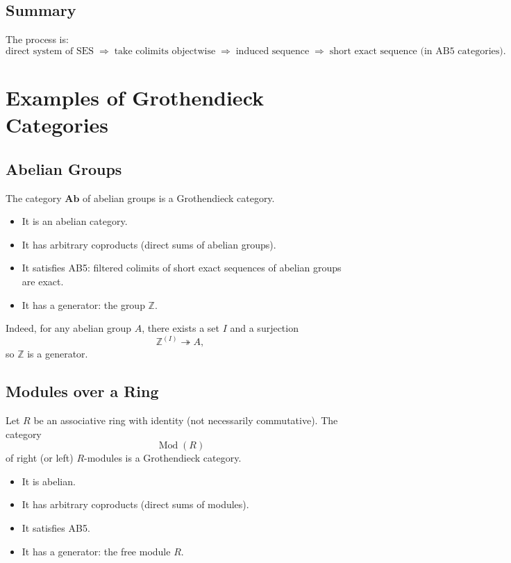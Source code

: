 \subsection*{Summary}

The process is:
\[
\text{direct system of SES}
\;\Longrightarrow\;
\text{take colimits objectwise}
\;\Longrightarrow\;
\text{induced sequence}
\;\Longrightarrow\;
\text{short exact sequence (in AB5 categories)}.
\]

\section{Examples of Grothendieck Categories}

\subsection{Abelian Groups}

The category $\mathbf{Ab}$ of abelian groups is a Grothendieck category.

\begin{itemize}
    \item It is an abelian category.
    \item It has arbitrary coproducts (direct sums of abelian groups).
    \item It satisfies AB5: filtered colimits of short exact sequences of abelian groups are exact.
    \item It has a generator: the group $\mathbb{Z}$.
\end{itemize}

Indeed, for any abelian group $A$, there exists a set $I$ and a surjection
\[
\mathbb{Z}^{(I)} \twoheadrightarrow A,
\]
so $\mathbb{Z}$ is a generator.

\subsection{Modules over a Ring}

Let $R$ be an associative ring with identity (not necessarily commutative). The category
\[
\operatorname{Mod}(R)
\]
of right (or left) $R$-modules is a Grothendieck category.

\begin{itemize}
    \item It is abelian.
    \item It has arbitrary coproducts (direct sums of modules).
    \item It satisfies AB5.
    \item It has a generator: the free module $R$.
\end{itemize}

